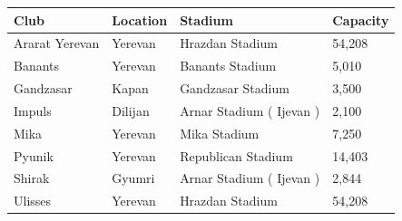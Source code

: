 \documentclass{article}
\begin{document}
\begin{tabular}{llll}
\toprule
Club & Location & Stadium & Capacity \\
\midrule
Ararat Yerevan & Yerevan & Hrazdan Stadium & 54,208 \\
Banants & Yerevan & Banants Stadium & 5,010 \\
Gandzasar & Kapan & Gandzasar Stadium & 3,500 \\
Impuls & Dilijan & Arnar Stadium ( Ijevan ) & 2,100 \\
Mika & Yerevan & Mika Stadium & 7,250 \\
Pyunik & Yerevan & Republican Stadium & 14,403 \\
Shirak & Gyumri & Arnar Stadium ( Ijevan ) & 2,844 \\
Ulisses & Yerevan & Hrazdan Stadium & 54,208 \\
\bottomrule
\end{tabular}
\end{document}
